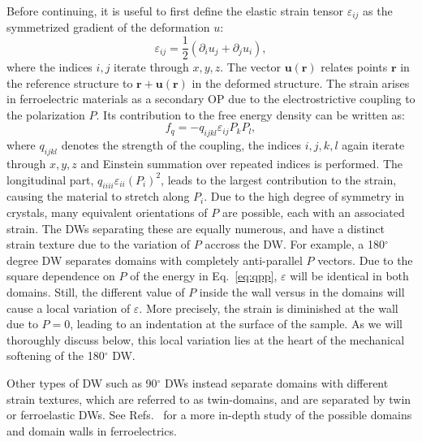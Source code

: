Before continuing, it is useful to first define the elastic strain tensor $\varepsilon_{ij}$ as the symmetrized gradient of the deformation $u$:
\begin{equation}
\varepsilon_{ij} = \frac{1}{2}(\partial_i u_j + \partial_j u_i),
\end{equation}
where the indices $i,j$ iterate through $x, y, z$.
The vector $\bm{u}(\bm{r})$ relates points $\bm{r}$ in the reference structure to $\bm{r} + \bm{u}(\bm{r})$ in the deformed structure.
The strain arises in ferroelectric materials as a secondary OP due to the electrostrictive coupling to the polarization $P$.
Its contribution to the free energy density can be written as:
\begin{equation}
	f_{q}=-q_{ijkl}\varepsilon_{ij}P_{k}P_{l},\label{eq:qpp}
\end{equation}
where $q_{ijkl}$ denotes the strength of the coupling, the indices $i, j, k, l$ again iterate through $x, y, z$ and Einstein summation over repeated indices is performed.
The longitudinal part, $q_{iiii} \varepsilon_{ii} (P_i)^2$, leads to the largest contribution to the strain, causing the material to stretch along $P_i$.
Due to the high degree of symmetry in crystals, many equivalent orientations of $P$ are possible, each with an associated strain. The DWs separating these are equally numerous, and have a distinct strain texture due to the variation of $P$ accross the DW.
For example, a 180$^\circ$ degree DW separates domains with completely anti-parallel $P$ vectors.
Due to the square dependence on $P$ of the energy in Eq.~\ref{eq:qpp}, $\varepsilon$ will be identical in both domains. Still, the different value of $P$ inside the wall versus in the domains will cause a local variation of $\varepsilon$. More precisely, the strain is diminished at the wall due to $P=0$, leading to an indentation at the surface of the sample.
As we will thoroughly discuss below, this local variation lies at the heart of the mechanical softening of the 180$^\circ$ DW.

Other types of DW such as 90$^\circ$ DWs instead separate domains with different strain textures, which are referred to as twin-domains, and are separated by twin or ferroelastic DWs.
See Refs.~\cite{Cao1991,Hu1998,Marton2010} for a more in-depth study of the possible domains and domain walls in ferroelectrics.

